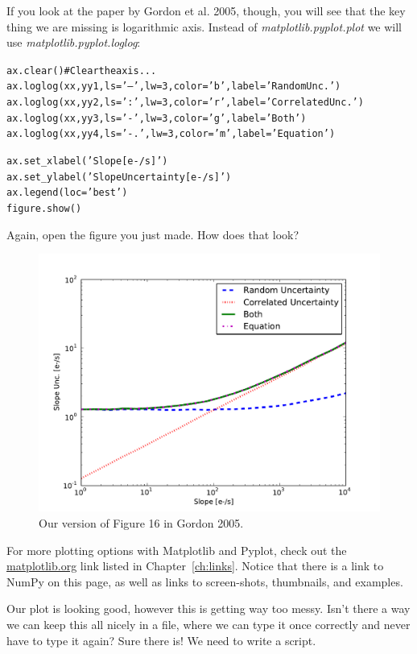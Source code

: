If you look at the paper by
Gordon et al. 2005, though, you will see that the key thing we are missing is
logarithmic axis.  Instead of \textit{matplotlib.pyplot.plot} we will use \textit{matplotlib.pyplot.loglog}:

\begin{alltt}
\pytab ax.clear()      # Clear the axis...
\pytab ax.loglog(xx, yy1, ls='--', lw=3, color='b', label='Random Unc.')
\pytab ax.loglog(xx, yy2, ls=':', lw=3, color='r', label='Correlated Unc.')
\pytab ax.loglog(xx, yy3, ls='-', lw=3, color='g', label='Both')
\pytab ax.loglog(xx, yy4, ls='-.', lw=3, color='m', label='Equation')

\pytab ax.set_xlabel('Slope [e-/s]')
\pytab ax.set_ylabel('Slope Uncertainty [e-/s]')
\pytab ax.legend(loc='best')
\pytab figure.show()
\end{alltt}

Again, open the figure you just made.  How does that look?  

\begin{figure}[tbp]
  \centering
    \includegraphics[scale=0.6]{splot_log.pdf}
    \caption{Our version of Figure 16 in Gordon 2005.}
  \label{fig:splot}
\end{figure}

For more
plotting options with Matplotlib and Pyplot, check out the 
\href{http://matplotlib.org/}{matplotlib.org} link listed in
Chapter~\ref{ch:links}.  Notice that there is a link to NumPy on this
page, as well as links to screen-shots, thumbnails, and examples.

Our plot is looking good, however this is getting way too messy.
Isn't there a way we can keep this all nicely in a file, where we can
type it once correctly and never have to type it again?  Sure there
is!  We need to write a script.
